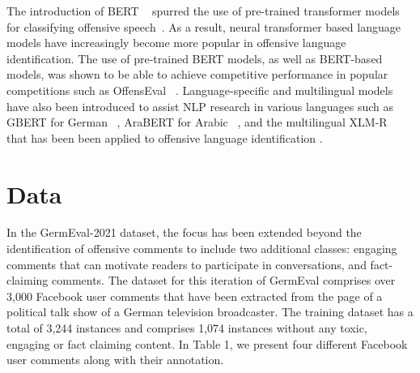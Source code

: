 \documentclass[11pt,a4paper]{article}
\begin{document}
The introduction of  BERT ~\cite{devlin2019bert} spurred the use of pre-trained transformer models for classifying offensive speech~\cite{ranasinghemudes}. As a result, neural transformer based language models have increasingly become more popular in offensive language identification. The use of pre-trained BERT models, as well as BERT-based models, was shown to be able to achieve competitive performance in popular competitions such as OffensEval ~\cite{offenseval,zampieri-etal-2020-semeval}. Language-specific and multilingual models have also been introduced to assist NLP research in various languages such as GBERT for German ~\cite{chan-etal-2020-germans}, AraBERT for Arabic ~\cite{antoun-etal-2020-arabert}, and the multilingual XLM-R ~\cite{conneau2019unsupervised} that has been been applied to offensive language identification \cite{ranasinghe-etal-2020-multilingual,ranasingheTALLIP}.


\section{Data}
\label{sec:data}

In the GermEval-2021 dataset, the focus has been extended beyond the identification of offensive comments to include two additional classes: engaging comments that can motivate readers to participate in conversations, and fact-claiming comments. The dataset for this iteration of GermEval comprises over 3,000 Facebook user comments that have been extracted from the page of a political talk show of a German television broadcaster. The training dataset has a total of 3,244 instances and comprises 1,074 instances without any toxic, engaging or fact claiming content. In Table 1, we present four different Facebook user comments along with their annotation.  


\begin{table}[H]
\centering
{}
\caption{GermEval 2021 - Training Set User Comment Distribution}
\label{tab:stats}
\end{table}
\end{document}
